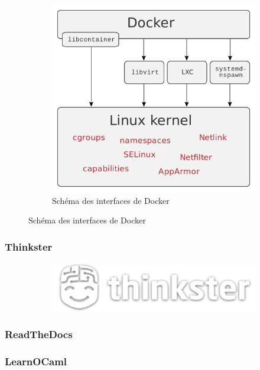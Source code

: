 \documentclass{article}
\begin{document}
\begin{figure}[h!]
	\centering
  	\begin{subfigure}[b]{0.55\linewidth}
	\includegraphics[width=\linewidth]{dockeri.png}
	\caption{Schéma des interfaces de Docker}
  	\end{subfigure}
\end{figure}
\newpage

\subsubsection{Thinkster}
\begin{figure}[h!]
	\centering
  	\begin{subfigure}[b]{0.55\linewidth}
	\includegraphics[width=\linewidth]{thinkster.png}
  	\end{subfigure}
\end{figure}
\subsubsection{ReadTheDocs}
\subsubsection{LearnOCaml}
\end{document}
